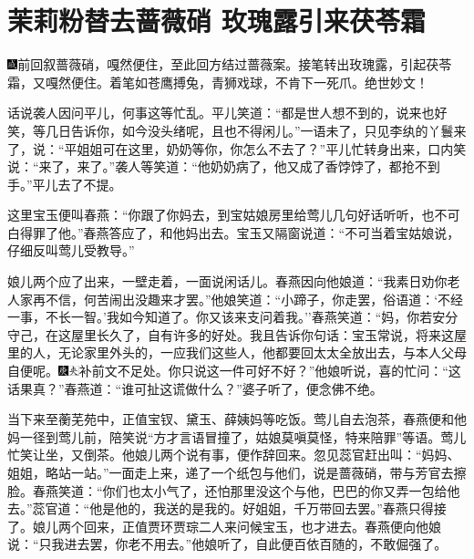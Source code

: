 

\chapter{茉莉粉替去蔷薇硝 玫瑰露引来茯苓霜}

{\includegraphics[width=3mm]{../Images/00005}前回叙蔷薇硝，嘎然便住，至此回方结过蔷薇案。接笔转出玫瑰露，引起茯苓霜，又嘎然便住。着笔如苍鹰搏兔，青狮戏球，不肯下一死爪。绝世妙文！}

话说袭人因问平儿，何事这等忙乱。平儿笑道：``都是世人想不到的，说来也好笑，等几日告诉你，如今没头绪呢，且也不得闲儿。''一语未了，只见李纨的丫鬟来了，说：``平姐姐可在这里，奶奶等你，你怎么不去了？''平儿忙转身出来，口内笑说：``来了，来了。''袭人等笑道：``他奶奶病了，他又成了香饽饽了，都抢不到手。''平儿去了不提。

这里宝玉便叫春燕：``你跟了你妈去，到宝姑娘房里给莺儿几句好话听听，也不可白得罪了他。''春燕答应了，和他妈出去。宝玉又隔窗说道：``不可当着宝姑娘说，仔细反叫莺儿受教导。''

娘儿两个应了出来，一壁走着，一面说闲话儿。春燕因向他娘道：``我素日劝你老人家再不信，何苦闹出没趣来才罢。''他娘笑道：``小蹄子，你走罢，俗语道：`不经一事，不长一智。'我如今知道了。你又该来支问着我。''春燕笑道：``妈，你若安分守己，在这屋里长久了，自有许多的好处。我且告诉你句话：宝玉常说，将来这屋里的人，无论家里外头的，一应我们这些人，他都要回太太全放出去，与本人父母自便呢。{\includegraphics[width=3mm]{../Images/00004}\includegraphics[width=3mm]{../Images/00012}\footnotesize \kaishu 补前文不足处。}你只说这一件可好不好？''他娘听说，喜的忙问：``这话果真？''春燕道：``谁可扯这谎做什么？''婆子听了，便念佛不绝。

当下来至蘅芜苑中，正值宝钗、黛玉、薛姨妈等吃饭。莺儿自去泡茶，春燕便和他妈一径到莺儿前，陪笑说``方才言语冒撞了，姑娘莫嗔莫怪，特来陪罪''等语。莺儿忙笑让坐，又倒茶。他娘儿两个说有事，便作辞回来。忽见蕊官赶出叫：``妈妈、姐姐，略站一站。''一面走上来，递了一个纸包与他们，说是蔷薇硝，带与芳官去擦脸。春燕笑道：``你们也太小气了，还怕那里没这个与他，巴巴的你又弄一包给他去。''蕊官道：``他是他的，我送的是我的。好姐姐，千万带回去罢。''春燕只得接了。娘儿两个回来，正值贾环贾琮二人来问候宝玉，也才进去。春燕便向他娘说：``只我进去罢，你老不用去。''他娘听了，自此便百依百随的，不敢倔强了。

